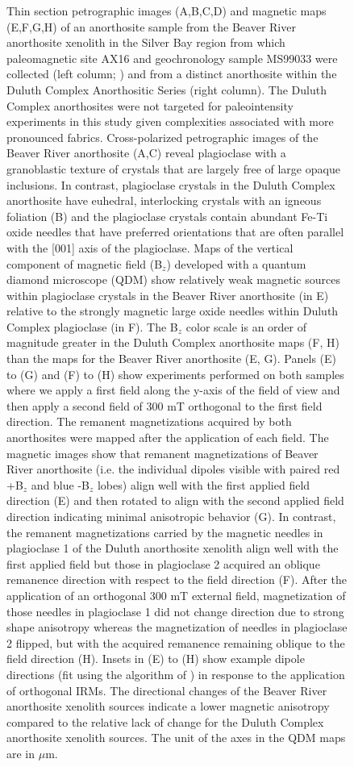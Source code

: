 \begin{figure}
\caption{\tiny Thin section petrographic images (A,B,C,D) and magnetic maps (E,F,G,H) of an anorthosite sample from the Beaver River anorthosite xenolith in the Silver Bay region from which paleomagnetic site AX16 and geochronology sample MS99033 were collected (left column;  \citealp{Zhang2021b}) and from a distinct anorthosite within the Duluth Complex Anorthositic Series (right column). The Duluth Complex anorthosites were not targeted for paleointensity experiments in this study given complexities associated with more pronounced fabrics. Cross-polarized petrographic images of the Beaver River anorthosite (A,C) reveal plagioclase with a granoblastic texture of crystals that are largely free of large opaque inclusions. In contrast, plagioclase crystals in the Duluth Complex anorthosite have euhedral, interlocking crystals with an igneous foliation (B) and the plagioclase crystals contain abundant Fe-Ti oxide needles that have preferred orientations that are often parallel with the [001] axis of the plagioclase. Maps of the vertical component of magnetic field (B$_z$) developed with a quantum diamond microscope (QDM) show relatively weak magnetic sources within plagioclase crystals in the Beaver River anorthosite (in E) relative to the strongly magnetic large oxide needles within Duluth Complex plagioclase (in F). The B$_z$ color scale is an order of magnitude greater in the Duluth Complex anorthosite maps (F, H) than the maps for the Beaver River anorthosite (E, G). Panels (E) to (G) and (F) to (H) show experiments performed on both samples where we apply a first field along the y-axis of the field of view and then apply a second field of 300 mT orthogonal to the first field direction. The remanent magnetizations acquired by both anorthosites were mapped after the application of each field. The magnetic images show that remanent magnetizations of Beaver River anorthosite (i.e. the individual dipoles visible with paired red +B$_z$ and blue -B$_z$ lobes) align well with the first applied field direction (E) and then rotated to align with the second applied field direction indicating minimal anisotropic behavior (G). In contrast, the remanent magnetizations carried by the magnetic needles in plagioclase 1 of the Duluth anorthosite xenolith align well with the first applied field but those in plagioclase 2 acquired an oblique remanence direction with respect to the field direction (F). After the application of an orthogonal 300 mT external field, magnetization of those needles in plagioclase 1 did not change direction due to strong shape anisotropy whereas the magnetization of needles in plagioclase 2 flipped, but with the acquired remanence remaining oblique to the field direction (H). Insets in (E) to (H) show example dipole directions (fit using the algorithm of \citep{Lima2016a}) in response to the application of orthogonal IRMs. The directional changes of the Beaver River anorthosite xenolith sources indicate a lower magnetic anisotropy compared to the relative lack of change for the Duluth Complex anorthosite xenolith sources. The unit of the axes in the QDM maps are in $\mu$m.}
\label{fig:Petro_QDM}
\end{figure}

